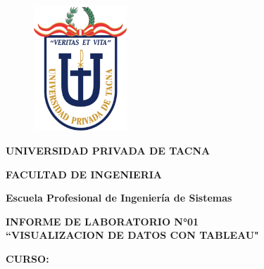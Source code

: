 \documentclass[12pt,letterpaper]{article}
\begin{document}
    \begin{titlepage}
        \begin{center}
            \begin{figure}[htb]
                \begin{center}
                    \includegraphics[width=3.5cm]{./img/logo}
                \end{center}
            \end{figure}
            \vspace*{0.15in}
            \begin{Large}
                \textbf{UNIVERSIDAD PRIVADA DE TACNA}\\
            \end{Large}
            \vspace*{0.15in}
            \begin{Large}
                \textbf{FACULTAD DE INGENIERIA} \\
            \end{Large}
            \vspace*{0.1in}
            \begin{Large}
                \textbf{Escuela Profesional de Ingeniería de Sistemas} \\
            \end{Large}
            \vspace*{0.3in}
            \begin{Large}
                \textbf{INFORME DE LABORATORIO N°01}\\
                \textbf{``VISUALIZACION DE DATOS CON TABLEAU"}\\
            \end{Large}
            \vspace*{0.2in}
            \begin{Large}
                \textbf{CURSO:} \\
            \end{Large}
            \vspace*{0.1in}
            \begin{large}

\end{large}
\end{center}
\end{titlepage}
\end{document}
